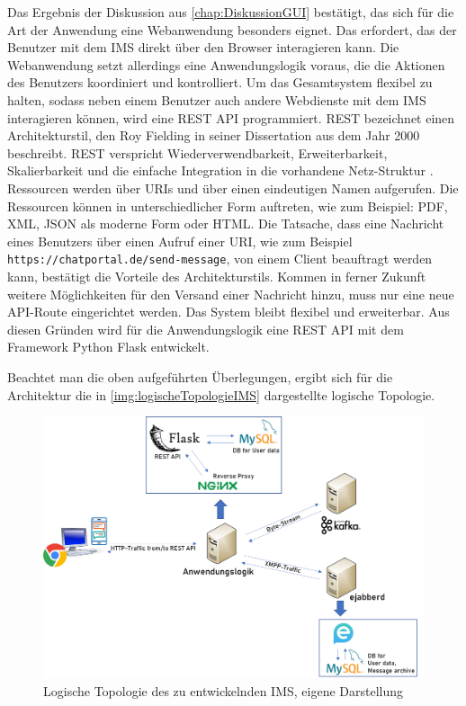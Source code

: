 \documentclass[a4paper,titlepage,halfparskip,12pt]{scrreprt}
\begin{document}
\begin{onehalfspacing}
Das Ergebnis der Diskussion aus \autoref{chap:DiskussionGUI} bestätigt, das sich für die Art der Anwendung eine Webanwendung besonders eignet. Das erfordert, das der Benutzer mit dem \ac{IMS} direkt über den Browser interagieren kann. Die Webanwendung setzt allerdings eine Anwendungslogik voraus, die die Aktionen des Benutzers koordiniert und kontrolliert. Um das Gesamtsystem flexibel zu halten, sodass neben einem Benutzer auch andere Webdienste mit dem \ac{IMS} interagieren können, wird eine \acs{REST} \acs{API} programmiert. \acs{REST} bezeichnet einen Architekturstil, den Roy Fielding in seiner Dissertation \cite{fieldingREST} aus dem Jahr 2000 beschreibt. \ac{REST} verspricht Wiederverwendbarkeit, Erweiterbarkeit, Skalierbarkeit und die einfache Integration in die vorhandene Netz-Struktur \cite{fieldingREST}. Ressourcen werden über \acs{URI}s und über einen eindeutigen Namen aufgerufen. Die Ressourcen können in unterschiedlicher Form auftreten, wie zum Beispiel: \acs{PDF}, \acs{XML}, \acs{JSON} als moderne Form oder \acs{HTML}. Die Tatsache, dass eine Nachricht eines Benutzers über einen Aufruf einer \acs{URI}, wie zum Beispiel \texttt{https://chatportal.de/send-message}, von einem Client beauftragt werden kann, bestätigt die Vorteile des Architekturstils. Kommen in ferner Zukunft weitere Möglichkeiten für den Versand einer Nachricht hinzu, muss nur eine neue \acs{API}-Route eingerichtet werden. Das System bleibt flexibel und erweiterbar. Aus diesen Gründen wird für die Anwendungslogik eine \acs{REST} \acs{API} mit dem Framework Python Flask entwickelt.

Beachtet man die oben aufgeführten Überlegungen, ergibt sich für die Architektur die in \autoref{img:logischeTopologieIMS} dargestellte logische Topologie.

\begin{figure}[h]
	\centering
	\includegraphics[width=\linewidth]{images/DetailliertesIMSArchitecture}
	\caption{Logische Topologie des zu entwickelnden \ac{IMS}, eigene Darstellung}
	\label{img:logischeTopologieIMS}
\end{figure}


\end{onehalfspacing}
\end{document}
